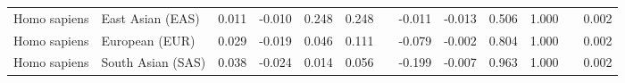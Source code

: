 \begin{center}
\begin{adjustbox}{width = 1\textwidth}
\begin{tabular}{|l|l|r|r|r|r|r|r|r|r|r|}
        Homo sapiens &                East Asian (EAS) &                 0.011 &                               -0.010 &                0.248 &                                  0.248~~ &                -0.011 &                               -0.013 &                0.506 &                                  1.000~~ &              0.002 \\
        Homo sapiens &                  European (EUR) &                 0.029 &                               -0.019 &                0.046 &                                  0.111~~ &                -0.079 &                               -0.002 &                0.804 &                                  1.000~~ &              0.002 \\
        Homo sapiens &               South Asian (SAS) &                 0.038 &                               -0.024 &                0.014 &                                  0.056~~ &                -0.199 &                               -0.007 &                0.963 &                                  1.000~~ &              0.002 \\
\bottomrule
\end{tabular}
\end{adjustbox}
\end{center}
